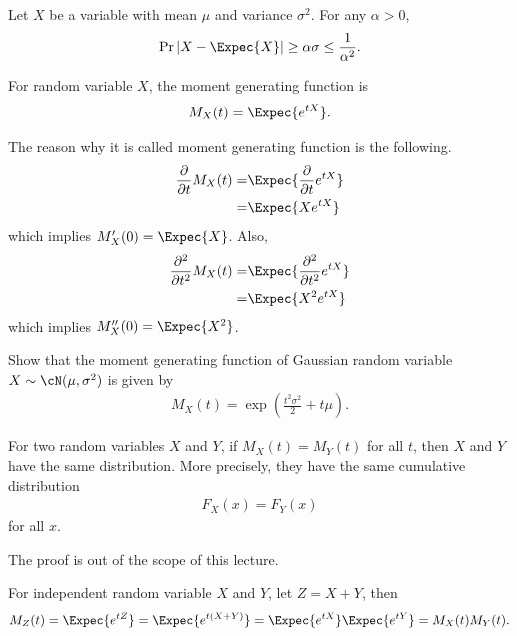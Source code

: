\documentclass{article}
\begin{document}
\begin{theorem}
Let $X$ be a variable with mean $\mu$ and variance $\sigma^2$.
For any $\alpha > 0$,
\begin{align}
    \Pr{|X- \Expec{X} | \geq \alpha\sigma} \leq \frac{1}{\alpha^2}.
\end{align}
\end{theorem}

\begin{definition} 
For random variable $X$, the moment generating function is
\begin{align}
    M_X(t) = \Expec{e^{tX}}.
\end{align}
\end{definition}

The reason why it is called moment generating function is the following.
\begin{align}
    \frac{\partial}{\partial t}M_X(t) =& \Expec{\frac{\partial}{\partial t} e^{tX}}\\
    =& \Expec{X e^{tX}}
\end{align}
which implies $M_X'(0) = \Expec{X}$.
Also, 
\begin{align}
    \frac{\partial^2}{\partial t^2}M_X(t) =& \Expec{\frac{\partial^2}{\partial t^2} e^{tX}}\\
    =& \Expec{X^2 e^{tX}}
\end{align}
which implies $M_X''(0) = \Expec{X^2}$.

\begin{exercise}
    Show that the moment generating function of Gaussian random variable $X\sim\cN(\mu, \sigma^2)$ is given by
    \begin{align}
        M_X(t) = \exp\left(\frac{t^2\sigma^2}{2} + t\mu  \right).
    \end{align}
\end{exercise}

\begin{theorem}
    For two random variables $X$ and $Y$, if $M_X(t) = M_Y(t)$ for all $t$, then $X$ and $Y$ have the same distribution.
    More precisely, they have the same cumulative distribution
    \begin{align}
        F_X(x) = F_Y(x)
    \end{align}
    for all $x$.
\end{theorem}
The proof is out of the scope of this lecture.

For independent random variable $X$ and $Y$, let $Z= X+Y$, then
\begin{align}
    M_Z(t) = \Expec{e^{tZ}} 
    = \Expec{e^{t(X+Y)}} 
    = \Expec{e^{tX}} \Expec{e^{tY}} 
    = M_X(t) M_Y(t).
\end{align}
\end{document}
